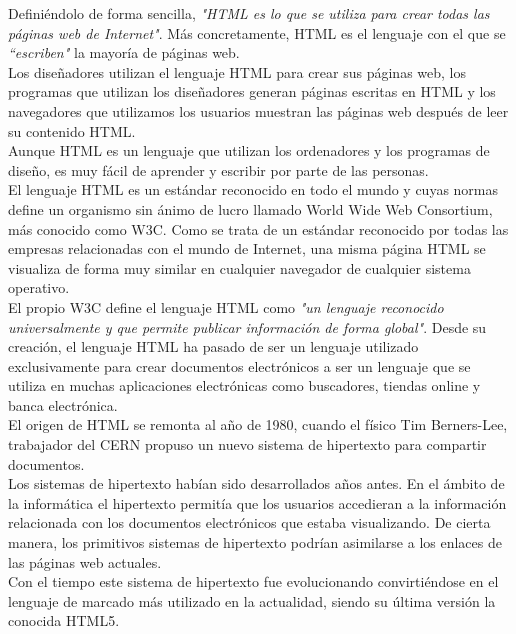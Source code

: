 Defini\'endolo de forma sencilla, \textsl{"HTML es lo que se utiliza para crear todas las p\'aginas web de Internet"}. M\'as concretamente, HTML es el lenguaje con el que se \textsl{``escriben"} la mayor\'ia de p\'aginas web.\\

Los dise\~nadores utilizan el lenguaje HTML para crear sus p\'aginas web, los programas que utilizan los dise\~nadores generan p\'aginas escritas en HTML y los navegadores que utilizamos los usuarios muestran las p\'aginas web despu\'es de leer su contenido HTML.\\

Aunque HTML es un lenguaje que utilizan los ordenadores y los programas de dise\~no, es muy f\'acil de aprender y escribir por parte de las personas.\\

El lenguaje HTML es un est\'andar reconocido en todo el mundo y cuyas normas define un organismo sin \'animo de lucro llamado World Wide Web Consortium, m\'as conocido como W3C. Como se trata de un est\'andar reconocido por todas las empresas relacionadas con el mundo de Internet, una misma p\'agina HTML se visualiza de forma muy similar en cualquier navegador de cualquier sistema operativo.\\

El propio W3C define el lenguaje HTML como \textsl{"un lenguaje reconocido universalmente y que permite publicar informaci\'on de forma global"}. Desde su creaci\'on, el lenguaje HTML ha pasado de ser un lenguaje utilizado exclusivamente para crear documentos electr\'onicos a ser un lenguaje que se utiliza en muchas aplicaciones electr\'onicas como buscadores, tiendas online y banca electr\'onica.\\

El origen de HTML se remonta al a\~no de 1980, cuando el f\'isico Tim Berners-Lee, trabajador del CERN propuso un nuevo sistema de hipertexto para compartir documentos.\\

Los sistemas de hipertexto hab\'ian sido desarrollados a\~nos antes. En el \'ambito de la inform\'atica el hipertexto permit\'ia que los usuarios accedieran a la informaci\'on relacionada con los documentos electr\'onicos que estaba visualizando. De cierta manera, los primitivos sistemas de hipertexto podr\'ian asimilarse a los enlaces de las p\'aginas web actuales.\\

Con el tiempo este sistema de hipertexto fue evolucionando convirti\'endose en el lenguaje de marcado m\'as utilizado en la actualidad, siendo su \'ultima versi\'on la conocida HTML5.\\

